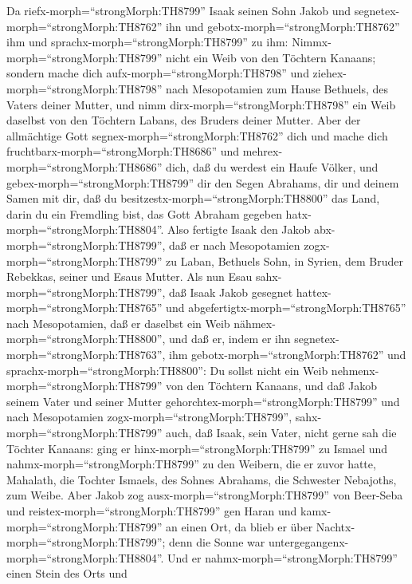  Da riefx-morph=``strongMorph:TH8799'' Isaak seinen Sohn
Jakob und segnetex-morph=``strongMorph:TH8762'' ihn und
gebotx-morph=``strongMorph:TH8762'' ihm und
sprachx-morph=``strongMorph:TH8799'' zu ihm:
Nimmx-morph=``strongMorph:TH8799'' nicht ein Weib von den Töchtern
Kanaans;  sondern mache dich
aufx-morph=``strongMorph:TH8798'' und
ziehex-morph=``strongMorph:TH8798'' nach Mesopotamien zum Hause
Bethuels, des Vaters deiner Mutter, und nimm
dirx-morph=``strongMorph:TH8798'' ein Weib daselbst von den Töchtern
Labans, des Bruders deiner Mutter.  Aber der allmächtige
Gott segnex-morph=``strongMorph:TH8762'' dich und mache dich
fruchtbarx-morph=``strongMorph:TH8686'' und
mehrex-morph=``strongMorph:TH8686'' dich, daß du werdest ein Haufe
Völker,  und gebex-morph=``strongMorph:TH8799'' dir den
Segen Abrahams, dir und deinem Samen mit dir, daß du
besitzestx-morph=``strongMorph:TH8800'' das Land, darin du ein Fremdling
bist, das Gott Abraham gegeben hatx-morph=``strongMorph:TH8804''.
 Also fertigte Isaak den Jakob
abx-morph=``strongMorph:TH8799'', daß er nach Mesopotamien
zogx-morph=``strongMorph:TH8799'' zu Laban, Bethuels Sohn, in Syrien,
dem Bruder Rebekkas, seiner und Esaus Mutter.  Als nun Esau
sahx-morph=``strongMorph:TH8799'', daß Isaak Jakob gesegnet
hattex-morph=``strongMorph:TH8765'' und
abgefertigtx-morph=``strongMorph:TH8765'' nach Mesopotamien, daß er
daselbst ein Weib nähmex-morph=``strongMorph:TH8800'', und daß er, indem
er ihn segnetex-morph=``strongMorph:TH8763'', ihm
gebotx-morph=``strongMorph:TH8762'' und
sprachx-morph=``strongMorph:TH8800'': Du sollst nicht ein Weib
nehmenx-morph=``strongMorph:TH8799'' von den Töchtern Kanaans,
 und daß Jakob seinem Vater und seiner Mutter
gehorchtex-morph=``strongMorph:TH8799'' und nach Mesopotamien
zogx-morph=``strongMorph:TH8799'', 
sahx-morph=``strongMorph:TH8799'' auch, daß Isaak, sein Vater, nicht
gerne sah die Töchter Kanaans:  ging er
hinx-morph=``strongMorph:TH8799'' zu Ismael und
nahmx-morph=``strongMorph:TH8799'' zu den Weibern, die er zuvor hatte,
Mahalath, die Tochter Ismaels, des Sohnes Abrahams, die Schwester
Nebajoths, zum Weibe.  Aber Jakob zog
ausx-morph=``strongMorph:TH8799'' von Beer-Seba und
reistex-morph=``strongMorph:TH8799'' gen Haran  und
kamx-morph=``strongMorph:TH8799'' an einen Ort, da blieb er über
Nachtx-morph=``strongMorph:TH8799''; denn die Sonne war
untergegangenx-morph=``strongMorph:TH8804''. Und er
nahmx-morph=``strongMorph:TH8799'' einen Stein des Orts und
